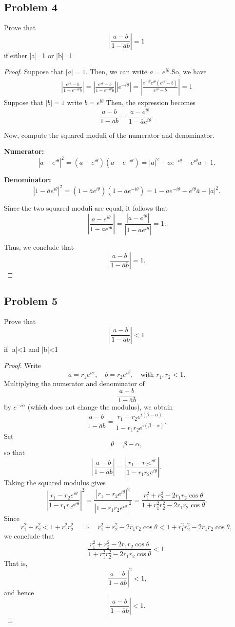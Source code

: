 \documentclass[letterpaper, 11pt]{article}
\newcommand{\1}{\mathds{1}}	%
\theoremstyle{definition}
\begin{document}
\subsection*{Problem 4}
Prove that $$
    |\frac{a-b}{1-\bar{a}b}|=1
$$ if either |a|=1 or |b|=1
\begin{proof}
Suppose that $|a|=1$. Then, we can write $a=e^{i\theta}$.So, we have
\begin{align*}{}{}
|\frac{e^{i\theta}-b}{1-e^{-i\theta}b}|=|\frac{e^{i\theta}-b}{1-e^{-i\theta}b}||e^{-i\theta}|=|\frac{e^{-i\theta}e^{i\theta}(e^{i\theta}-b)}{e^{i\theta}-b}|=1
\end{align*}
Suppose that $ |b|=1 $  write 
\(
b = e^{i\theta} 
\)
Then, the expression becomes
\[
\frac{a-b}{1-\overline{a}b} = \frac{a-e^{i\theta}}{1-\overline{a}e^{i\theta}}.
\]

Now, compute the squared moduli of the numerator and denominator.

\textbf{Numerator:}
\[
|a-e^{i\theta}|^2 = (a-e^{i\theta})(\overline{a}-e^{-i\theta})
= |a|^2 - a e^{-i\theta} - e^{i\theta}\overline{a}+1.
\]

\textbf{Denominator:}
\[
|1-\overline{a}e^{i\theta}|^2 = (1-\overline{a}e^{i\theta})(1-a e^{-i\theta})
= 1 - a e^{-i\theta} - e^{i\theta}\overline{a}+|a|^2.
\]

Since the two squared moduli are equal, it follows that
\[
\left|\frac{a-e^{i\theta}}{1-\overline{a}e^{i\theta}}\right| = \frac{|a-e^{i\theta}|}{|1-\overline{a}e^{i\theta}|} = 1.
\]

Thus, we conclude that
\[
\left|\frac{a-b}{1-\overline{a}b}\right| = 1.
\]
\end{proof}
\subsection*{Problem 5}
Prove that $$
    |\frac{a-b}{1-\bar{a}b}|<1
$$ if |a|<1 and |b|<1
\begin{proof}
    Write
\[
a = r_1e^{i\alpha}, \quad b = r_2e^{i\beta}, \quad \text{with } r_1,r_2<1.
\]
Multiplying the numerator and denominator of
\[
\frac{a-b}{1-\overline{a}b}
\]
by \(e^{-i\alpha}\) (which does not change the modulus), we obtain
\[
\frac{a-b}{1-\overline{a}b} = \frac{r_1 - r_2e^{i(\beta-\alpha)}}{1- r_1r_2e^{i(\beta-\alpha)}}.
\]
Set
\[
\theta = \beta-\alpha,
\]
so that
\[
\left|\frac{a-b}{1-\overline{a}b}\right| = \left|\frac{r_1 - r_2e^{i\theta}}{1- r_1r_2e^{i\theta}}\right|.
\]
Taking the squared modulus gives
\[
\left|\frac{r_1 - r_2e^{i\theta}}{1- r_1r_2e^{i\theta}}\right|^2
=\frac{|r_1 - r_2e^{i\theta}|^2}{|1- r_1r_2e^{i\theta}|^2}
=\frac{r_1^2 + r_2^2 - 2r_1r_2\cos\theta}{1 + r_1^2r_2^2 - 2r_1r_2\cos\theta}.
\]
Since
\[
r_1^2 + r_2^2 < 1 + r_1^2r_2^2 \quad\Longrightarrow\quad r_1^2 + r_2^2 - 2r_1r_2\cos\theta < 1 + r_1^2r_2^2 - 2r_1r_2\cos\theta,
\]
we conclude that
\[
\frac{r_1^2 + r_2^2 - 2r_1r_2\cos\theta}{1 + r_1^2r_2^2 - 2r_1r_2\cos\theta} < 1.
\]
That is,
\[
\left|\frac{a-b}{1-\overline{a}b}\right|^2 < 1,
\]
and hence
\[
\left|\frac{a-b}{1-\overline{a}b}\right| < 1.
\]
\end{proof}
\end{document}
